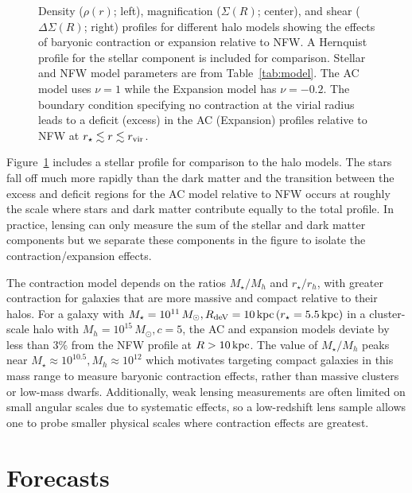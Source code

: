 \documentclass[12pt]{emulateapj}
\begin{document}
\begin{figure*}[htb]
\caption{Density ($\rho(r)$; left), magnification ($\Sigma(R)$;
  center), and shear ($\Delta\Sigma(R)$; right) profiles for different halo models showing the
  effects of baryonic contraction or expansion relative to NFW. A
  Hernquist profile for the stellar component is included for
  comparison. Stellar and NFW model parameters are from Table~\ref{tab:model}. The AC model uses
  $\nu=1$ while the Expansion model has $\nu=-0.2$. The boundary
  condition specifying no contraction at the virial radius leads to a
  deficit (excess) in the AC (Expansion) profiles relative to NFW at
  $r_{\star}\lesssim r\lesssim r_{\rm vir}$.}
\label{fig:compareAC}
\end{figure*}

Figure~\ref{fig:compareAC} includes a stellar profile for comparison
to the halo models. The stars fall off much more rapidly
than the dark matter and the transition between the excess and
deficit regions for the AC model relative to NFW occurs at roughly the scale
where stars and dark matter contribute equally to the total
profile. In practice, lensing can only measure the sum of the stellar
and dark matter components but we separate these components in the
figure to isolate the contraction/expansion effects. 

The contraction model depends on the ratios $M_{\star}/M_h$ and
$r_{\star}/r_h$, with greater contraction for galaxies that are more
massive and compact relative to their halos. For a galaxy with
$M_{\star}=10^{11}\,M_{\odot}, R_{\rm deV}=10\,{\rm kpc}\,
(r_\star=5.5\,{\rm kpc})$ in a
cluster-scale halo with $M_{h}=10^{15}\,M_{\odot}, c=5$, the AC and
expansion models deviate by less than $3\%$ from the NFW profile at
$R>10\,{\rm kpc}$. The value of $M_{\star}/M_{h}$ peaks near
$M_{\star}\approx10^{10.5}, M_h\approx10^{12}$
\citep[e.g.][]{Conroy2009, Behroozi2010, Leauthaud2012} which
motivates targeting compact galaxies in this mass range to measure
baryonic contraction effects, rather than massive clusters or low-mass
dwarfs. Additionally, weak lensing measurements are often limited on 
small angular scales due to systematic effects, so a low-redshift lens
sample allows one to probe smaller physical scales where contraction
effects are greatest.


\section{Forecasts}
\end{document}
